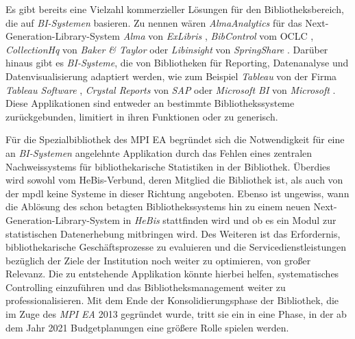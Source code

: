 Es gibt bereits eine Vielzahl kommerzieller Lösungen für den Bibliotheksbereich, die auf \textit{\acrshort{BI}-Systemen} basieren.
Zu nennen wären \textit{AlmaAnalytics} für das Next-Generation-Library-System \textit{Alma} von \textit{ExLibris} \cite{ex_libris_alma_2020},
\textit{BibControl} vom \acrfull{OCLC} \cite{oclc_bibcontrol_2020},
\textit{CollectionHq} von \textit{Baker \& Taylor}\cite{baker__taylor_select_2020} oder \textit{Libinsight} von \textit{SpringShare} \cite{springShare_libinsight_2020}.
Darüber hinaus gibt es \textit{\acrlong{BI}-Systeme}, die von Bibliotheken für Reporting, Datenanalyse und Datenvisualisierung adaptiert werden,
wie zum Beispiel \textit{Tableau} von der Firma \textit{Tableau Software} \cite{tableau_software_software_2020},
\textit{Crystal Reports} von \textit{SAP} \cite{sap_pixel-perfect_2020} oder \textit{Microsoft BI} von \textit{Microsoft} \cite{microsoft_datenvisualisierung_2020}.
Diese Applikationen sind entweder an bestimmte Bibliothekssysteme zurückgebunden, limitiert in ihren
Funktionen oder zu generisch.

Für die Spezialbibliothek des \acrfull{MPI EA} begründet sich die Notwendigkeit für eine an \textit{\acrshort{BI}-Systemen} angelehnte Applikation durch das
Fehlen eines zentralen Nachweissystems für bibliothekarische
Statistiken in der Bibliothek. Überdies wird sowohl vom \acrfull{HeBis}-Verbund, deren Mitglied die Bibliothek ist, als auch 
von der \acrfull{mpdl} keine Systeme in dieser Richtung angeboten. Ebenso ist ungewiss, wann die Ablösung des schon betagten Bibliothekssystems hin zu 
einem neuen Next-Generation-Library-System in \textit{\acrshort{HeBis}} stattfinden wird und ob
es ein Modul zur statistischen Datenerhebung mitbringen wird. 
Des Weiteren ist das Erfordernis, bibliothekarische Geschäftsprozesse zu evaluieren und die
Servicedienstleistungen bezüglich der Ziele der Institution noch weiter zu
optimieren, von großer Relevanz. 
Die zu entstehende Applikation könnte hierbei helfen, systematisches Controlling einzuführen und das
Bibliotheksmanagement weiter zu professionalisieren.
Mit dem Ende der Konsolidierungsphase der
Bibliothek, die im Zuge des \textit{\acrshort{MPI EA}} 2013 gegründet wurde, tritt sie ein in eine Phase, in der ab dem Jahr
2021 Budgetplanungen eine größere Rolle spielen werden.


